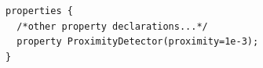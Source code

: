 \begin{verbatim}                                                                                                                                             
properties {                                                                                                                                                 
  /*other property declarations...*/                                                                                                                         
  property ProximityDetector(proximity=1e-3);                                                                                                                
}                                                                                                                                                            
\end{verbatim}

